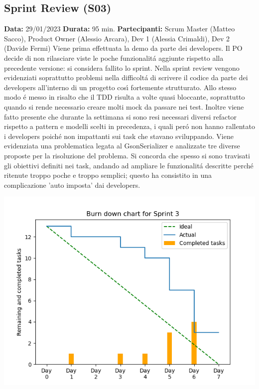 \begin{landscape}
        \subsection{Sprint Review (S03)}
        \textbf{Data:} 29/01/2023
        \newline \textbf{Durata:} 95 min.
        \newline \textbf{Partecipanti:} Scrum Master (Matteo Sacco), Product Owner (Alessio Arcara), Dev 1 (Alessia Crimaldi), Dev 2 (Davide Fermi)
        \newline Viene prima effettuata la demo da parte dei developers. Il PO decide di non rilasciare viste le poche funzionalit\'a aggiunte rispetto alla precedente versione: si considera fallito lo sprint.
        \newline Nella sprint review vengono evidenziati soprattutto problemi nella difficolt\'a di scrivere il codice da parte dei developers all'interno di un progetto cos\'{\i} fortemente strutturato. Allo stesso modo \'e messo in risalto che il TDD risulta a volte quasi bloccante, soprattutto quando si rende necessario creare molti mock da passare nei test. Inoltre viene fatto presente che durante la settimana si sono resi necessari diversi refactor rispetto a pattern e modelli scelti in precedenza, i quali per\'o non hanno rallentato i developers poich\'e non impattanti sui task che stavano sviluppando. Viene evidenziata una problematica legata al GsonSerializer e analizzate tre diverse proposte per la risoluzione del problema.
        \newline Si concorda che spesso si sono travisati gli obiettivi definiti nei task, andando ad ampliare le funzionalit\'a descritte perch\'e ritenute troppo poche e troppo semplici; questo ha consistito in una complicazione 'auto imposta' dai developers.
        \newline

        \includegraphics[scale=0.8]{Sprint03_BurnDownChart}


\end{landscape}
